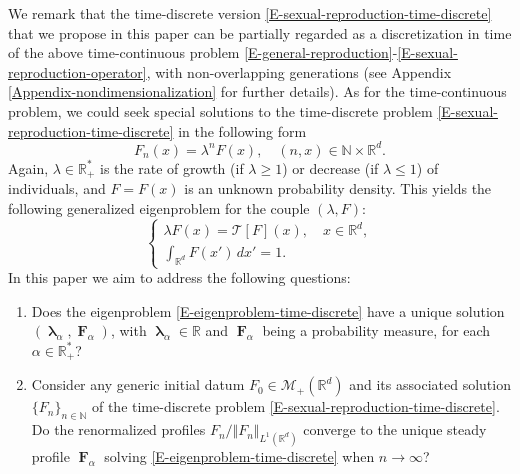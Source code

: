 \documentclass[reqno]{amsart}
\DeclareMathOperator{\blambda}{\boldsymbol{\lambda}}
\DeclareMathOperator{\bF}{\boldsymbol{F}}
\numberwithin{equation}{section}
\begin{document}
{We remark that the time-discrete version \eqref{E-sexual-reproduction-time-discrete} that we propose in this paper can be partially regarded as a discretization in time of the above time-continuous problem \eqref{E-general-reproduction}-\eqref{E-sexual-reproduction-operator}, with non-overlapping generations (see Appendix \ref{Appendix-nondimensionalization} for further details). As for the time-continuous problem, we could seek special solutions to the time-discrete problem \eqref{E-sexual-reproduction-time-discrete} in the following form
\begin{equation}\label{E-ansatz-discrete}
F_n(x)=\lambda^n F(x),\quad (n,x)\in \mathbb{N}\times\mathbb{R}^d.
\end{equation}
Again, $\lambda\in \mathbb{R}_+^*$ is the rate of growth (if $\lambda\geq 1$) or decrease (if $\lambda\leq 1$) of individuals, and $F=F(x)$ is an unknown probability density. This yields the following generalized eigenproblem for the couple $(\lambda,F)$:
\begin{equation}\label{E-eigenproblem-time-discrete}
\left\{\begin{array}{l}
\lambda F(x)=\mathcal{T}[F](x),\quad x\in \mathbb{R}^d,\\
\int_{\mathbb{R}^d}F(x')\,dx'=1.
\end{array}\right.
\end{equation}
In this paper we aim to address the following questions:
\begin{enumerate}[label={\bf(Q\arabic*)}]
\item Does the eigenproblem \eqref{E-eigenproblem-time-discrete} have a unique solution $(\blambda_\alpha,\bF_\alpha)$, with $\blambda_\alpha\in\mathbb{R}$ and $\bF_\alpha$ being a probability measure, for each $\alpha\in \mathbb{R}_+^*$?
\item Consider any generic initial datum $F_0\in \mathcal{M}_+(\mathbb{R}^d)$ and its associated solution $\{F_n\}_{n\in \mathbb{N}}$ of the time-discrete problem \eqref{E-sexual-reproduction-time-discrete}. Do the renormalized profiles $F_n/\Vert F_n\Vert_{L^1(\mathbb{R}^d)}$ converge to the unique steady profile $\bF_\alpha$ solving \eqref{E-eigenproblem-time-discrete} when $n\rightarrow \infty$?
\end{enumerate}
}
\end{document}

